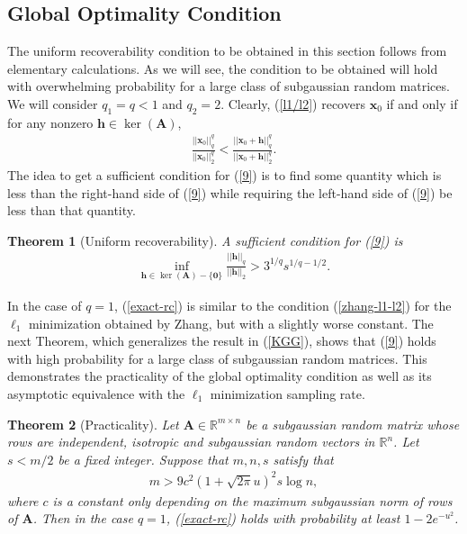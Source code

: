 \documentclass[11pt]{article}
\numberwithin{equation}{section}
\theoremstyle{plain}
\newtheorem{Th}{Theorem}[section]
\theoremstyle{definition}
\def\R{{\mathbb R}}
\def\R{{\mathbb R}}
\def\A{{\mathbf A}}
\def\x{{\mathbf x}}
\def\h{{\mathbf{h}}}
\begin{document}
\subsection{Global Optimality Condition}

The uniform recoverability condition to be obtained in this section follows from elementary calculations. As we will see, the condition to be obtained will hold with overwhelming probability for a large class of subgaussian random matrices. We will consider $q_1=q<1$ and $q_2=2$. Clearly, (\ref{l1/l2}) recovers $\x_0$ if and only if for any nonzero $\h\in \ker(\A)$,
\begin{align}
\frac{||\x_0||^q_q}{||\x_0||^q_2}<\frac{||\x_0+\h||^q_q}{||\x_0+\h||^q_2}.\label{9}
\end{align}
The idea to get a sufficient condition for (\ref{9}) is to find some quantity which is less than the right-hand side of (\ref{9}) while requiring the left-hand side of (\ref{9}) be less than that quantity.     

\begin{Th}[Uniform recoverability]\label{T5}
A sufficient condition for (\ref{9}) is
\begin{align}
\inf_{\h\in\ker(\A)-\{\mathbf{0}\}}\frac{||\h||_q}{||\h||_2}>3^{1/q}s^{1/q-1/2}.\label{exact-rc}
\end{align}
\end{Th} 

In the case of $q=1$, (\ref{exact-rc}) is similar to the condition (\ref{zhang-l1-l2}) for the $\ell_1$ minimization obtained by Zhang, but with a slightly worse constant. The next Theorem, which generalizes the result in (\ref{KGG}), shows that (\ref{9}) holds with high probability for a large class of subgaussian random matrices. This demonstrates the practicality of the global optimality condition as well as its asymptotic equivalence with the $\ell_1$ minimization sampling rate. 


\begin{Th}[Practicality]\label{T4}
Let $\A\in\R^{m\times n}$ be a subgaussian random matrix whose rows are independent, isotropic and subgaussian random vectors in $\R^n$. Let $s<m/2$ be a fixed integer. Suppose that $m, n, s$ satisfy that 
\begin{align*}
m>9c^2(1+\sqrt{2\pi}u)^2s\log n,
\end{align*}
where $c$ is a constant only depending on the maximum subgaussian norm of rows of $\A$. Then in the case $q=1$, (\ref{exact-rc}) holds with probability at least $1-2e^{-u^2}$. 
\end{Th}
\end{document}
